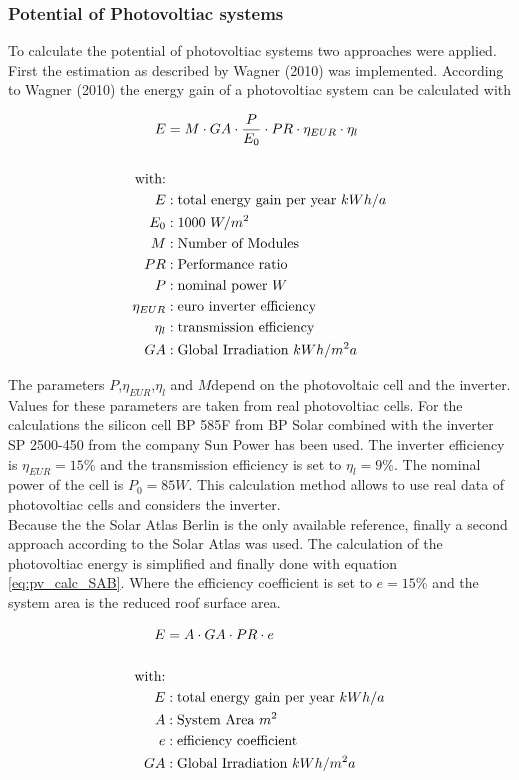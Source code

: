\subsubsection{Potential of Photovoltiac systems}
To calculate the potential of photovoltiac systems two approaches were applied. First the estimation as described by Wagner (2010)  was implemented. According to Wagner (2010) the energy gain of a photovoltiac system can be calculated with 

\begin{align}
\label{eq:pv_calc}
E &= M \cdot GA \cdot \frac{P}{E_0} \cdot PR \cdot \eta_{EUR} \cdot \eta_l \\\notag\\\notag
\text{with:}&\\\notag
E &:\text{total energy gain per year \(kWh/a\)} \\\notag
E_0 &:\text{1000 \(W/m^2\)} \\\notag
M &:\text{Number of Modules} \\\notag
PR &:\text {Performance ratio} \\\notag
P &:\text{nominal power \(W\)} \\\notag
\eta_{EUR} &:\text{euro inverter efficiency} \\\notag
\eta_l&:\text{transmission efficiency} \\\notag
GA &:\text{Global Irradiation \(kWh/m^2 a\)} \notag
\end{align}

The parameters \(P\),\(\eta_{EUR}\),\(\eta_l\) and \(M\)depend on the photovoltaic cell and the inverter. Values for these parameters are taken from real photovoltiac cells. For the calculations the silicon cell BP 585F from BP Solar  combined with the inverter SP 2500-450 from the company Sun Power  has been used. The inverter efficiency is \(\eta_{EUR} = 15 \%\) and the transmission efficiency is set to \(\eta_l = 9\%\). The nominal power of the cell is \(P_0 = 85 W\). This calculation method allows to use real data of photovoltiac cells and considers the inverter.
\\

Because the the Solar Atlas Berlin is the only available reference, finally a second approach according to the Solar Atlas was used. The calculation of the photovoltiac energy is simplified and finally done with equation \ref{eq:pv_calc_SAB}. Where the efficiency coefficient is set to \(e=15\%\) and the system area is the reduced roof surface area.

\begin{align}
\label{eq:pv_calc_SAB}
E &= A \cdot GA \cdot PR \cdot e \\\notag\\\notag
\text{with:}&\\\notag
E &:\text{total energy gain per year \(kWh/a\)} \\\notag
A &:\text{System Area \(m^2\)} \\\notag
e &:\text{efficiency coefficient} \\\notag
GA &:\text{Global Irradiation \(kWh/m^2 a\)} \notag
\end{align}



